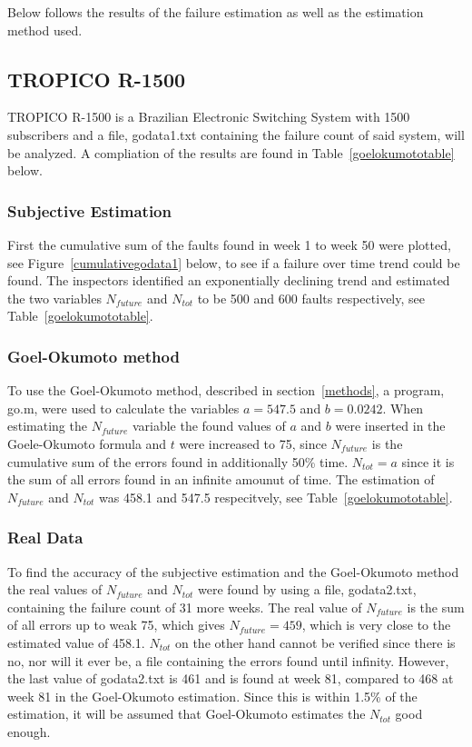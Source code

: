 Below follows the results of the failure estimation as well as the estimation method used.

\subsection{TROPICO R-1500}
TROPICO R-1500 is a Brazilian Electronic Switching System with 1500 subscribers and a file, godata1.txt containing the failure count of said system, will be analyzed. A compliation of the results are found in Table~\ref{goelokumototable} below.
\subsubsection*{Subjective Estimation} 
First the cumulative sum of the faults found in week 1 to week 50 were plotted, see Figure~\ref{cumulativegodata1} below, to see if a failure over time trend could be found.
The inspectors identified an exponentially declining trend and estimated the two variables $N_{future}$ and $N_{tot}$ to be 500 and 600 faults respectively, see Table~\ref{goelokumototable}. 
\subsubsection*{Goel-Okumoto method}
To use the Goel-Okumoto method, described in section~\ref{methods}, a program, go.m, were used to calculate the variables $a=547.5$ and $b=0.0242$.
When estimating the $N_{future}$ variable the found values of $a$ and $b$ were inserted in the Goele-Okumoto formula and $t$ were increased to 75, since $N_{future}$ is the cumulative sum of the errors found in additionally 50\% time. 
$N_{tot} = a$ since it is the sum of all errors found in an infinite amounut of time.
The estimation of $N_{future}$ and $N_{tot}$ was 458.1 and 547.5 respecitvely, see Table~\ref{goelokumototable}.
\subsubsection*{Real Data}
\label{realdatago}
To find the accuracy of the subjective estimation and the Goel-Okumoto method the real values of $N_{future}$ and $N_{tot}$ were found by using a file, godata2.txt, containing the failure count of 31 more weeks. 
The real value of $N_{future}$ is the sum of all errors up to weak 75, which gives $N_{future}=459$, which is very close to the estimated value of 458.1. $N_{tot}$ on the other hand cannot be verified since there is no, nor will it ever be, a file containing the errors found until infinity. However, the last value of godata2.txt is 461 and is found at week 81, compared to 468 at week 81 in the Goel-Okumoto estimation. Since this is within 1.5\% of the estimation, it will be assumed that Goel-Okumoto estimates the $N_{tot}$ good enough.

